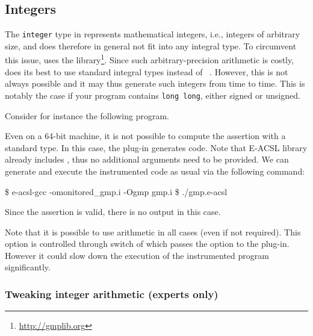 
\subsection{Integers}
\label{sec:integers}

The \texttt{integer} type in \eacsl represents mathematical
integers, i.e., integers of arbitrary size, and does therefore in general not fit
into any integral \C type. To circumvent this issue, \eacsl uses the \gmp
library\footnote{\url{http://gmplib.org}}.
Since such arbitrary-precision arithmetic is costly, \eacsl does its best to use
standard integral \C types instead of \gmp~\cite{kosmatov20rv,benjamin23tap}.
However, this is not always possible and it may thus generate such \gmp integers
from time to time. This is notably the case if your program contains
\lstinline|long long|, either signed or unsigned.

Consider for instance the following program.


Even on a 64-bit machine, it is not possible to compute the assertion with a
standard \C type. In this case, the \eacsl plug-in generates \gmp code.  Note
that E-ACSL library already includes \gmp, thus no additional arguments need to
be provided.  We can generate and execute the instrumented code as usual via
the following command:

\begin{shell}
\$ e-acsl-gcc -omonitored_gmp.i -Ogmp gmp.i
\$ ./gmp.e-acsl
\end{shell}

Since the assertion is valid, there is no output in this case.

Note that it is possible to use \gmp arithmetic in all cases (even if not
required). This option is controlled through  switch of \eacslgcc
which passes the  option to the \eacsl
plug-in. However it could slow down the execution of the instrumented program
significantly.

\subsubsection{Tweaking integer arithmetic (experts only)}

